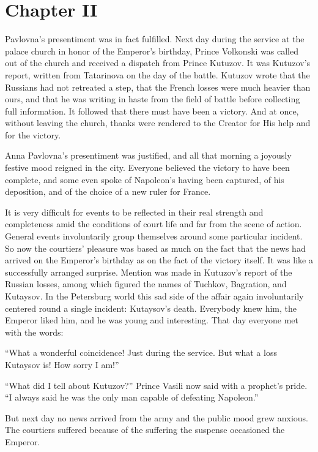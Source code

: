 \chapter*{Chapter II} \ifaudio {}
\fi

 Pavlovna's presentiment was in fact fulfilled. Next day
during the service at the palace church in honor of the Emperor's
birthday, Prince Volkonski was called out of the church and
received a dispatch from Prince Kutuzov. It was Kutuzov's report,
written from Tatarinova on the day of the battle. Kutuzov wrote
that the Russians had not retreated a step, that the French
losses were much heavier than ours, and that he was writing in
haste from the field of battle before collecting full
information. It followed that there must have been a victory. And
at once, without leaving the church, thanks were rendered to the
Creator for His help and for the victory.

Anna Pavlovna's presentiment was justified, and all that morning
a joyously festive mood reigned in the city. Everyone believed
the victory to have been complete, and some even spoke of
Napoleon's having been captured, of his deposition, and of the
choice of a new ruler for France.

It is very difficult for events to be reflected in their real
strength and completeness amid the conditions of court life and
far from the scene of action. General events involuntarily group
themselves around some particular incident. So now the courtiers'
pleasure was based as much on the fact that the news had arrived
on the Emperor's birthday as on the fact of the victory
itself. It was like a successfully arranged surprise. Mention was
made in Kutuzov's report of the Russian losses, among which
figured the names of Tuchkov, Bagration, and Kutaysov. In the
Petersburg world this sad side of the affair again involuntarily
centered round a single incident: Kutaysov's death. Everybody
knew him, the Emperor liked him, and he was young and
interesting. That day everyone met with the words:

``What a wonderful coincidence! Just during the service. But what
a loss Kutaysov is! How sorry I am!''

``What did I tell about Kutuzov?'' Prince Vasili now said with a
prophet's pride. ``I always said he was the only man capable of
defeating Napoleon.''

But next day no news arrived from the army and the public mood
grew anxious. The courtiers suffered because of the suffering the
suspense occasioned the Emperor.

